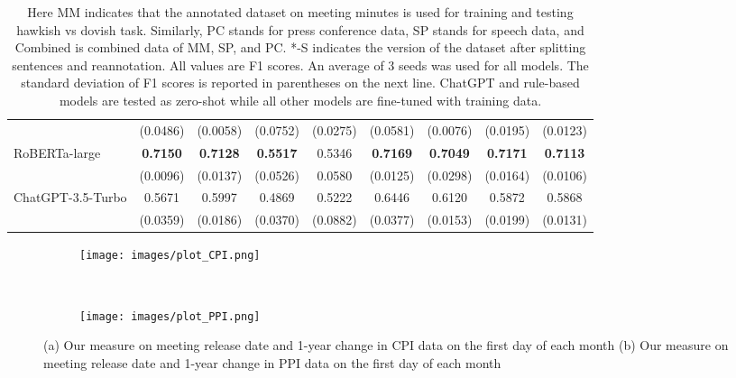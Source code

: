 \documentclass[11pt]{article}
\begin{document}
\begin{table*}[ht]
\begin{tabular}{lcccccccc}
             & (0.0486) & (0.0058) & (0.0752) &  (0.0275) & (0.0581) & (0.0076) & (0.0195) & (0.0123) \\ 
  RoBERTa-large & \textbf{0.7150} & \textbf{0.7128} & \textbf{0.5517} &  0.5346 & \textbf{0.7169} & \textbf{0.7049} & \textbf{0.7171} & \textbf{0.7113} \\
                & (0.0096) & (0.0137) & (0.0526) &  0.0580 & (0.0125) & (0.0298) & (0.0164) & (0.0106) \\
   \hline
   ChatGPT-3.5-Turbo & 0.5671 & 0.5997 & 0.4869 &  0.5222 & 0.6446 & 0.6120 & 0.5872 & 0.5868 \\
                     & (0.0359) & (0.0186) & (0.0370) &  (0.0882) & (0.0377) & (0.0153) & (0.0199) & (0.0131) \\
    \hline
\end{tabular}

\caption{Here MM indicates that the annotated dataset on meeting minutes is used for training and testing hawkish vs dovish task. Similarly, PC stands for press conference data, SP stands for speech data, and Combined is combined data of MM, SP, and PC. *-S indicates the version of the dataset after splitting sentences and reannotation. All  values are F1 scores. An average of 3 seeds was used for all models. The standard deviation of F1 scores is reported in parentheses on the next line. ChatGPT and rule-based models are tested as zero-shot while all other models are fine-tuned with training data. }
\label{tb:master_accuracy}
\end{table*}


\begin{figure*}[ht]
\centering
   \begin{subfigure}{0.9\linewidth}
   \centering
   \texttt{[image: images/plot\_CPI.png]}
   \caption{}
   \label{fig:CPI_measure} 
\end{subfigure}
\hfill
\\[\baselineskip]
\begin{subfigure}{0.9\linewidth}
   \centering
   \texttt{[image: images/plot\_PPI.png]}
   \caption{}
   \label{fig:PPI_measure}
\end{subfigure}
\centering
\caption{(a) Our measure on meeting release date and 1-year change in CPI data on the first day of each month (b) Our measure on meeting release date and 1-year change in PPI data on the first day of each month}
\label{fig:CPI_PPI_measure}
\end{figure*}
\end{document}

